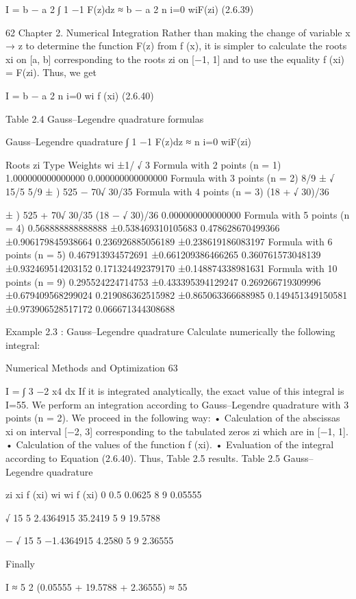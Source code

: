 \documentclass[letterpaper,12pt]{article}
\begin{document}
I = b − a
2
∫ 1
−1
F(z)dz ≈ b − a
2
n
i=0
wiF(zi) (2.6.39)

62 Chapter 2. Numerical Integration
Rather than making the change of variable x → z to determine the function F(z) from
f (x), it is simpler to calculate the roots xi on [a, b] corresponding to the roots zi on
[−1, 1] and to use the equality f (xi) = F(zi). Thus, we get

I = b − a
2
n
i=0
wi f (xi) (2.6.40)

Table 2.4 Gauss–Legendre quadrature formulas

Gauss–Legendre quadrature
∫ 1
−1
F(z)dz ≈
n
i=0
wiF(zi)

Roots zi Type Weights wi
±1/
√
3 Formula with 2 points (n = 1) 1.000000000000000
0.000000000000000 Formula with 3 points (n = 2) 8/9
±
√
15/5 5/9
±
)
525 − 70√
30/35 Formula with 4 points (n = 3) (18 + √
30)/36

±
)
525 + 70√
30/35 (18 − √
30)/36
0.000000000000000 Formula with 5 points (n = 4) 0.568888888888888
±0.538469310105683 0.478628670499366
±0.906179845938664 0.236926885056189
±0.238619186083197 Formula with 6 points (n = 5) 0.467913934572691
±0.661209386466265 0.360761573048139
±0.932469514203152 0.171324492379170
±0.148874338981631 Formula with 10 points (n = 9) 0.295524224714753
±0.433395394129247 0.269266719309996
±0.679409568299024 0.219086362515982
±0.865063366688985 0.149451349150581
±0.973906528517172 0.066671344308688

Example 2.3 :
Gauss–Legendre quadrature
Calculate numerically the following integral:

Numerical Methods and Optimization 63

I =
∫ 3
−2
x4 dx
If it is integrated analytically, the exact value of this integral is I=55.
We perform an integration according to Gauss–Legendre quadrature with 3 points (n = 2).
We proceed in the following way:
• Calculation of the abscissas xi on interval [−2, 3] corresponding to the tabulated zeros zi which
are in [−1, 1].
• Calculation of the values of the function f (xi).
• Evaluation of the integral according to Equation (2.6.40).
Thus, Table 2.5 results.
Table 2.5 Gauss–Legendre quadrature

zi xi f (xi) wi wi f (xi)
0 0.5 0.0625 8
9 0.05555

√
15
5 2.4364915 35.2419 5
9 19.5788

−
√
15
5 −1.4364915 4.2580 5
9 2.36555

Finally

I ≈ 5
2
(0.05555 + 19.5788 + 2.36555) ≈ 55
\end{document}
